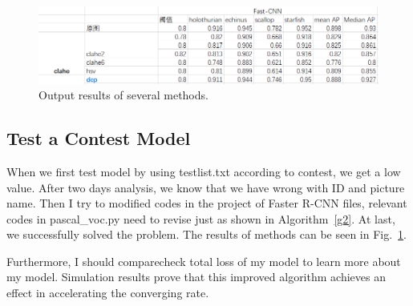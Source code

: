\documentclass[a4paper]{article}
\begin{document}
\begin{figure}
	\begin{center}
		\includegraphics[scale=0.8]{figures/3.jpg}
	\end{center}
	\caption{Output results of several methods.}
	\label{p2}
\end{figure}

\subsection{Test a Contest Model}

When we first test model by using testlist.txt according to contest, we get a low value. After two days analysis, we know that we have wrong with ID and picture name. Then I try to modified codes in the project of Faster R-CNN files, relevant codes in pascal\_voc.py need to revise just as shown in Algorithm~\ref{g2}. At last, we successfully solved the problem. The results of methods can be seen in Fig.~\ref{p2}.


Furthermore, I should comparecheck total loss of my model to learn more about my model. Simulation results prove that this improved algorithm achieves an effect in accelerating the converging rate.
\end{document}

